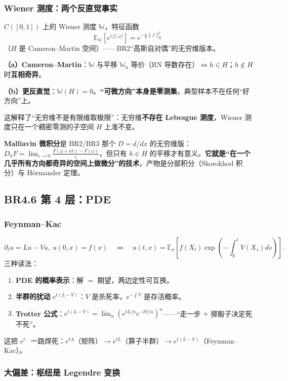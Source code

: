 \subsubsection{Wiener 测度：两个反直觉事实}

$C([0,1])$ 上的 Wiener 测度 $\mathbb{W}$，特征函数
\[
\mathbb{E}_{\mathbb{W}}\left[e^{i\langle f,\omega\rangle}\right]=e^{-\frac12\lVert f\rVert_H^2}
\]
（$H$ 是 Cameron--Martin 空间）——BR2“高斯自对偶”的无穷维版本。

\textbf{（a）Cameron--Martin}：$\mathbb{W}$ 与平移 $\mathbb{W}_h$ 等价（RN 导数存在）$\iff h\in H$；$h\notin H$ 时\textbf{互相奇异}。

\textbf{（b）更反直觉}：$\mathbb{W}(H)=0$。\textbf{“可微方向”本身是零测集}，典型样本不在任何“好方向”上。

这解释了“无穷维不是有限维取极限”：无穷维\textbf{不存在 Lebesgue 测度}，Wiener 测度只在一个稠密零测的子空间 $H$ 上准不变。

\textbf{Malliavin 微积分}是 BR2/BR3 那个 $D=d/dx$ 的无穷维版：$D_hF=\lim_{\epsilon\to0}\frac{F(\omega+\epsilon h)-F(\omega)}{\epsilon}$，但只有 $h\in H$ 的平移才有意义。\textbf{它就是“在一个几乎所有方向都奇异的空间上做微分”的技术}，产物是分部积分（Skorokhod 积分）与 H\"ormander 定理。

\subsection{BR4.6 第 4 层：PDE}

\subsubsection{Feynman--Kac}

\[
\partial_tu=Lu-Vu,\ u(0,x)=f(x)
\quad\Longleftrightarrow\quad
u(t,x)=\mathbb{E}_x\left[f(X_t)\exp\left(-\int_0^tV(X_s)ds\right)\right].
\]
三种读法：
\begin{enumerate}
  \item \textbf{PDE 的概率表示}：解 $=$ 期望，两边定性可互换。
  \item \textbf{半群的扰动} $e^{t(L-V)}$：$V$ 是杀死率，$e^{-\int V}$ 是存活概率。
  \item \textbf{Trotter 公式}：$e^{t(L-V)}=\lim_n\left(e^{tL/n}e^{-tV/n}\right)^n$——“走一步 $+$ 掷骰子决定死不死”。
\end{enumerate}
这把 $e^{t\cdot}$ 一路焊死：$e^{tA}$（矩阵）$\to e^{tL}$（算子半群）$\to e^{t(L-V)}$（Feynman--Kac）。

\subsubsection{大偏差：枢纽是 Legendre 变换}

